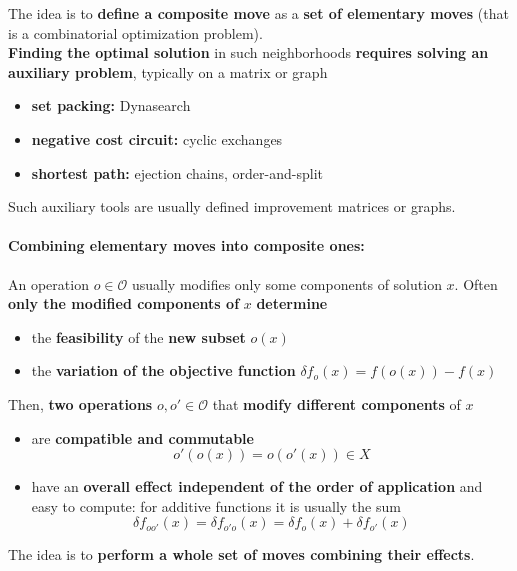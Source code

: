 The idea is to \textbf{define a composite move} as a \textbf{set of elementary moves} (that is a combinatorial optimization problem).\\

\textbf{Finding the optimal solution} in such neighborhoods \textbf{requires solving an auxiliary problem}, typically on a matrix or graph
\begin{itemize}
	\item \textbf{set packing:} Dynasearch
	
	\item \textbf{negative cost circuit:} cyclic exchanges
	
	\item \textbf{shortest path:} ejection chains, order-and-split
\end{itemize}

Such auxiliary tools are usually defined improvement matrices or graphs.\\

\paragraph{Combining elementary moves into composite ones:} An operation $o \in \mathcal{O}$ usually modifies only some components of solution $x$. Often \textbf{only the modified components of} $x$ \textbf{determine}
\begin{itemize}
	\item the \textbf{feasibility} of the \textbf{new subset} $o (x)$
	
	\item the \textbf{variation of the objective function} $\delta f_o (x) = f (o (x)) - f (x)$
\end{itemize}

Then, \textbf{two operations} $o, o' \in \mathcal{O}$ that \textbf{modify different components} of $x$ 
\begin{itemize}
	\item are \textbf{compatible and commutable}
	$$ o' (o (x)) = o (o' (x)) \in X $$
	
	\item have an \textbf{overall effect independent of the order of application} and easy to compute: for additive functions it is usually the sum
	$$ \delta f_{oo'} (x) = \delta f_{o'o} (x) = \delta f_o (x) + \delta f_{o'} (x) $$
\end{itemize}

The idea is to \textbf{perform a whole set of moves combining their effects}.\\

